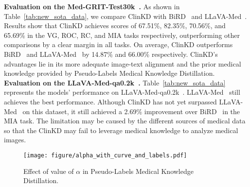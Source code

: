 \textbf{Evaluation on the Med-GRIT-Test30k~\cite{ye2023samed2d20m, cheng2023sammed2d}.} As shown in Table~\ref{tab:new_sota_data}, we compare ClinKD with BiRD~\cite{huang2024BiRD} and LLaVA-Med~\cite{li2024llava}. Results show that ClinKD achieves scores of 67.51\%, 82.35\%, 70.56\%, and 65.69\% in the VG, ROC, RC, and MIA tasks respectively, outperforming other comparisons by a clear margin in all tasks. On average, ClinKD outperforms BiRD~\cite{huang2024BiRD} and LLaVA-Med~\cite{li2024llava} by 14.87\% and 66.00\% respectively. ClinKD's advantages lie in its more adequate image-text alignment and the prior medical knowledge provided by Pseudo-Labels Medical Knowledge Distillation.\\
\textbf{Evaluation on the LLaVA-Med-qa0.2k~\cite{zhang2025biomedclipmultimodalbiomedicalfoundation}.} Table~\ref{tab:new_sota_data} represents the models' performance on LLaVA-Med-qa0.2k~\cite{zhang2025biomedclipmultimodalbiomedicalfoundation}. LLaVA-Med~\cite{li2024llava} still achieves the best performance. Although ClinKD has not yet surpassed LLaVA-Med~\cite{li2024llava} on this dataset, it still achieved a 2.69\% improvement over BiRD~\cite{huang2024BiRD} in the MIA task. The limitation may be caused by the different sources of medical data so that the ClinKD may fail to leverage medical knowledge to analyze medical images.
\begin{figure}[t]
    \hspace{-0.8cm}
    \texttt{[image: figure/alpha\_with\_curve\_and\_labels.pdf]}
    \vspace{-0.8cm}
    \caption{Effect of value of $\alpha$ in Pseudo-Labels Medical Knowledge Distillation.}
    \vspace{-0.5cm}
    \label{fig:alpha}
    \vspace{-1em}
\end{figure}


